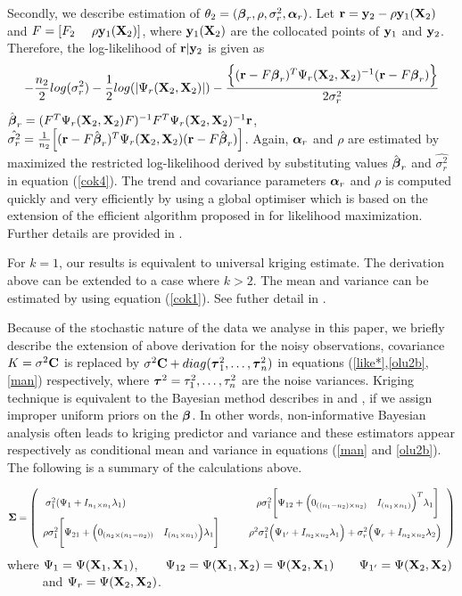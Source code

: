 Secondly, we describe estimation of $\theta_2=({\boldsymbol{\beta}}_r,\rho,\sigma_r^2,{\boldsymbol{\alpha}}_r)$. Let ${\mathbf{r}}={\bf y}_2-\rho {\bf y}_1({\bf X}_2)$ and  $F=[F_2~~~~\rho {\bf y}_1({\bf X}_2)]$,
where ${\bf y}_1({\bf X}_2)$ are the collocated points of ${\bf y}_1$ and ${\bf y}_2$.
 Therefore, the log-likelihood of ${\mathbf{r}}|{\bf y}_2$ is given as
\begin{equation}\label{cok4}
-\frac{n_2}{2} log(\sigma_r^2) -  \frac{1}{2}log(|\Psi_r({\bf X}_2,{\bf X}_2)|) - \frac{ \Big \{({\mathbf{r}}-F {\boldsymbol{\beta}}_r)^T \Psi_r({\bf X}_2,{\bf X}_2)^{-1}({\mathbf{r}}-F{\boldsymbol{\beta}}_r)\Big\}}{2\sigma_r^2}
\end{equation}
${\hat{\boldsymbol{\beta}}}_r=(F^T \Psi_r({\bf X}_2,{\bf X}_2) F)^{-1}F^T\Psi_r({\bf X}_2,{\bf X}_2)^{-1}{\mathbf{r}}$, ~~~~~ $\hat{\sigma_r^2}=\frac{1}{n_2} \Big[({\mathbf{r}}-F{\hat{\boldsymbol{\beta}}}_r)^T  \Psi_r({\bf X}_2,{\bf X}_2)({\mathbf{r}}-F{\hat{\boldsymbol{\beta}}}_r)\Big]$. Again, ${\boldsymbol{\alpha}}_r$ and $\rho$ are estimated by maximized the restricted log-likelihood derived by substituting values ${\hat{\boldsymbol{\beta}}}_r$ and $\hat{\sigma_r^2}$ in equation (\ref{cok4}). The trend and covariance parameters ${\boldsymbol{\alpha}}_r$ and $\rho$ is computed quickly and very efficiently by using a global optimiser which is based on the extension of the efficient algorithm proposed in \citet{pd9} for likelihood maximization. Further details are provided in \citep{pd8}.

For $k=1$, our results is equivalent to universal kriging estimate. The derivation above can be extended to a case where $k>2$. The mean and variance can be estimated by using equation (\ref{cok1}). See futher detail in \citep{co4}.

Because of the stochastic nature of the data we analyse in this paper, we briefly describe the extension of above derivation for the noisy observations, covariance $K=\sigma^2{\bf C}$ is replaced by $ \sigma^2{\bf C}+diag({{\boldsymbol{\tau}}}^2_1,\ldots,{{\boldsymbol{\tau}}}^2_n)$ in equations (\ref{like*},\ref{olu2b},\ref{man}) respectively, where ${{\boldsymbol{\tau}}}^2=\tau^2_1,\ldots,\tau^2_n$ are the noise variances. Kriging technique is equivalent to the Bayesian method describes in \citet{pd10} and \citet{q35}, if we assign improper uniform priors on the ${\boldsymbol{\beta}}$. In other words, non-informative Bayesian analysis often leads to kriging predictor and variance and these estimators appear respectively as conditional mean and variance in equations (\ref{man} and \ref{olu2b}). The following is a summary of the calculations above.



\[{\boldsymbol{\Sigma}}=
\left(
\begin{array}{cc}
\sigma_1^2(\Psi_1 +I_{n_1\times n_1}\lambda_1) ~~~~~~~~~~~~~~~~~~~~~~~~~~~~~~~~~~~~~~~~\rho\sigma_1^2\Bigg[\Psi_{12}+\Big(0_{((n_1-n_2) \times n_2)}~~~I_{(n_1\times n_1)}\Big)^T\lambda_1\Bigg] 
\\
\rho\sigma_1^2\Bigg[\Psi_{21}+\Big(0_{(n_2 \times (n_1-n_2))}~~~I_{(n_1\times n_1)}\Big)\lambda_1\Bigg] ~~~~~~~~~\rho^2\sigma_1^2\Big(\Psi_{1'} +I_{n_2\times n_2}\lambda_1\Big) + \sigma_r^2\Big(\Psi_r +I_{n_2\times n_2}\lambda_2\Big)
\end{array} 
\right)
\]
where $\Psi_1=\Psi({\bf X}_1,{\bf X}_1)$, ~~~ $\Psi_{12}=\Psi({\bf X}_1,{\bf X}_2)=\Psi({\bf X}_2,{\bf X}_1)$~~~ $\Psi_{1'}=\Psi({\bf X}_2,{\bf X}_2)$~~~~~ and $\Psi_r=\Psi({\bf X}_2,{\bf X}_2)$.


